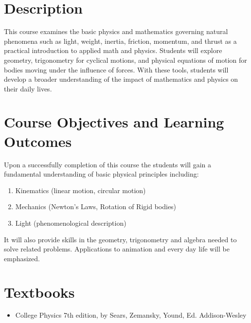 \documentclass[12pt]{article}
\begin{document}

\section*{Description}

This course examines the basic physics and mathematics governing natural phenomena such
as light, weight, inertia, friction, momentum, and thrust as a practical introduction to
applied math and physics. Students will explore geometry, trigonometry for cyclical motions,
and physical equations of motion for bodies moving under the influence of forces. With
these tools, students will develop a broader understanding of the impact of mathematics
and physics on their daily lives.




\section*{Course Objectives and Learning Outcomes }
Upon a successfully completion of this course the students will gain a fundamental understanding of basic physical principles including:

\begin{enumerate}
\item Kinematics (linear motion, circular motion)
\item Mechanics (Newton's Laws, Rotation of Rigid bodies)
\item Light (phenomenological description)
\end{enumerate}


It will also provide skills in the geometry, trigonometry and algebra needed to
solve related problems. Applications to animation and every day life will be emphasized.


\section*{Textbooks}

\begin{itemize}
\item 
	College Physics 7th edition, by Sears, Zemansky, Yound, Ed.
	Addison-Wesley
\end{itemize}
\end{document}
